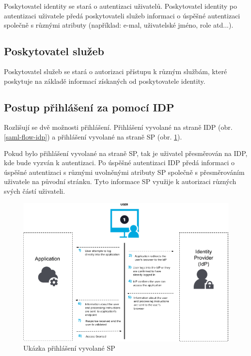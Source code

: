 Poskytovatel identity se stará o autentizaci uživatelů. Poskytovatel identity po autentizaci uživatele předá poskytovateli služeb informaci o úspěšné autentizaci společně s různými atributy (například: e-mal, uživatelské jméno, role atd...).

\subsection{Poskytovatel služeb}

Poskytovatel služeb se stará o autorizaci přístupu k různým službám, které poskytuje na základě informací získaných od poskytovatele identity.

\subsection{Postup přihlášení za pomocí IDP}\label{IDPlogin}

Rozlišují se dvě možnosti přihlášení. Přihlášení vyvolané na straně IDP (obr. \ref{saml-flow-idp}) a přihlášení vyvolané na straně SP (obr. \ref{saml-flow-sp}).


Pokud bylo přihlášení vyvolané na straně SP, tak je uživatel přesměrován na IDP, kde bude vyzván k autentizaci.
Po úspěšné autentizaci IDP předá informaci o úspěšné autentizaci s různými uvolněnými atributy SP společně s přesměrováním uživatele na původní stránku.
Tyto informace SP využije k autorizaci různých svých částí uživateli.\cite{SAMLxOIDC}
\begin{figure}[bp]
	\centering
    \includegraphics[width=1\textwidth]{obrazky-figures/saml-sp-cropped.png}
	\caption{Ukázka přihlášení vyvolané SP\cite{SAMLxOIDC}}
	\label{saml-flow-sp}
\end{figure}

